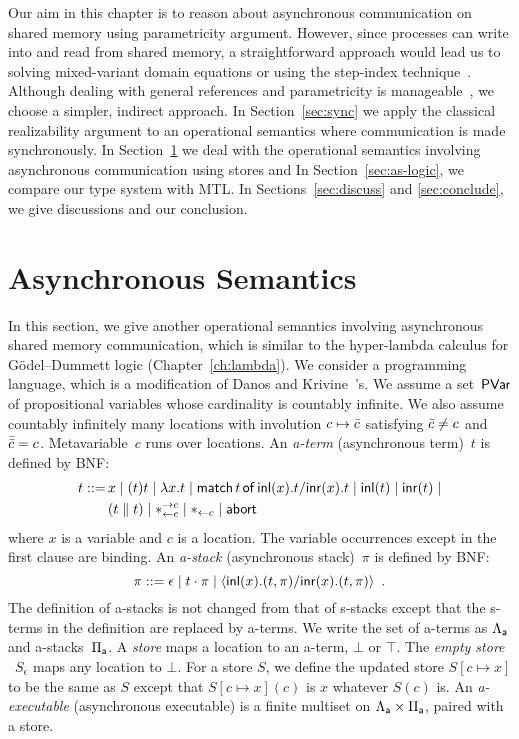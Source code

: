 Our aim in this chapter is to reason about asynchronous communication on
shared memory using parametricity argument.
However, since processes can write into and read from shared memory,
a straightforward approach would lead us to solving mixed-variant domain
equations or using the step-index technique~\citep{ahmed2006}.
Although dealing with general references and parametricity
is manageable~\citep{birkedal2009relational},
we choose a simpler, indirect approach.
In Section~\ref{sec:sync} we apply the classical realizability argument to
an operational semantics where
communication is made
synchronously.
In Section~\ref{sec:async} we deal with the
operational
semantics involving asynchronous communication using stores and
In Section~\ref{sec:as-logic}, we compare our type system with MTL.
In Sections~\ref{sec:discuss} and \ref{sec:conclude}, we give discussions
and our conclusion.

\section{Asynchronous Semantics}
\label{sec:async}

In this section, we give another operational semantics involving
asynchronous shared memory communication, which is similar to the
hyper-lambda calculus for G\"odel--Dummett logic (Chapter~\ref{ch:lambda}).
We consider a programming language, which is a modification of
Danos and Krivine~\citep{danos-krivine}'s.
We assume a set~$\mathsf{PVar}$ of propositional variables whose cardinality is
countably infinite.
We also assume countably infinitely many locations with involution
$c\mapsto \bar{c}$
satisfying $\bar{c}\neq c$ and $\bar{\bar{c}} = c$.
Metavariable~$c$ runs over locations.
An \textit{a-term} (asynchronous term)~$t$ is defined
by BNF:
\begin{align*}
 t::= \,&x
 \mid (t)t
 \mid \lambda x.t
 \mid \mathsf{match}\,{t}\,\mathsf{of}\, \mathsf{inl}({x}). {t}/ \mathsf{inr}({x}). {t}
 \mid \mathsf{inl}({t})
 \mid \mathsf{inr}({t})
 \mid \\ &
 (t\parallel t)
 \mid \ast^{\rightarrow {c}}_{\leftarrow{c}}
 \mid \ast_{\leftarrow{c}}
 \mid \mathsf{abort\,}
\end{align*}
where $x$ is a variable and $c$ is a location.  The variable occurrences
except in the first clause are binding.
An \textit{a-stack} (asynchronous stack)~$\pi$ is
defined by BNF:
\[
 \pi ::= \epsilon
 \mid t\cdot \pi
 \mid \langle \mathsf{inl}({x}). ({t},{\pi})/ \mathsf{inr}({x}). ({t},{\pi})\rangle
 \enspace.
\]
The definition of a-stacks is not changed from that of s-stacks except
that the s-terms in the definition are replaced by a-terms.
We write the set of a-terms as $\Lambda_{\mathsf a}$ and a-stacks~$\Pi_{\mathsf a}$.
A \textit{store} maps a location to an a-term, $\bot$ or $\top$.
The \textit{empty store}%
~$S_\epsilon$ maps any location to $\bot$.
For a store $S$, we define the updated store $S[c\mapsto x]$ to be
the same as $S$ except that $S[c\mapsto x](c)$ is $x$ whatever $S(c)$ is.
An \textit{a-executable} (asynchronous executable)
is a finite multiset on $\Lambda_{\mathsf a} \times \Pi_{\mathsf a}$,
paired with a store.

